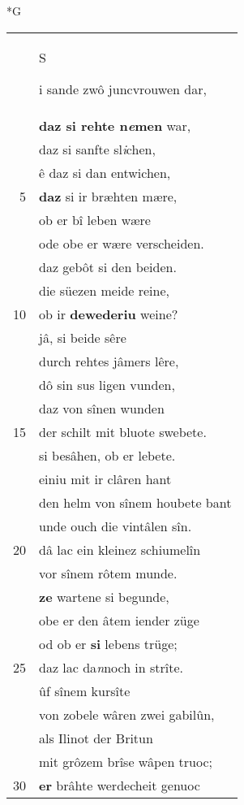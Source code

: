 \documentclass[8pt,a4paper,notitlepage]{article}
\begin{document}
\begin{table}[ht]
\begin{minipage}[t]{0.5\linewidth}
\small
\begin{center}*G
\end{center}
\begin{tabular}{rl}
 & \begin{large}S\end{large}i sande zwô juncvrouwen dar,\\ 
 & \textbf{daz si rehte n\textit{e}men} war,\\ 
 & daz si sanfte sl\textit{i}chen,\\ 
 & ê daz si dan entwichen,\\ 
5 & \textbf{daz} si ir bræhten mære,\\ 
 & ob er bî leben wære\\ 
 & ode obe er wære verscheiden.\\ 
 & daz gebôt si den beiden.\\ 
 & die süezen meide reine,\\ 
10 & ob ir \textbf{dewederiu} weine?\\ 
 & jâ, si beide sêre\\ 
 & durch rehtes jâmers lêre,\\ 
 & dô sin sus ligen vunden,\\ 
 & daz von sînen wunden\\ 
15 & der schilt mit bluote swebete.\\ 
 & si besâhen, ob er lebete.\\ 
 & einiu mit ir clâren hant\\ 
 & den helm von sînem houbete bant\\ 
 & unde ouch die vintâlen sîn.\\ 
20 & dâ lac ein kleinez schiumelîn\\ 
 & vor sînem rôtem munde.\\ 
 & \textbf{ze} wartene si begunde,\\ 
 & obe er den âtem iender züge\\ 
 & od ob er \textbf{si} lebens trüge;\\ 
25 & daz lac da\textit{n}noch in strîte.\\ 
 & ûf sînem kursîte\\ 
 & von zobele wâren zwei gabilûn,\\ 
 & als Ilinot der Britun\\ 
 & mit grôzem brîse wâpen truoc;\\ 
30 & \textbf{er} brâhte werdecheit genuoc\\ 

\end{tabular}
\end{minipage}
\end{table}
\end{document}
